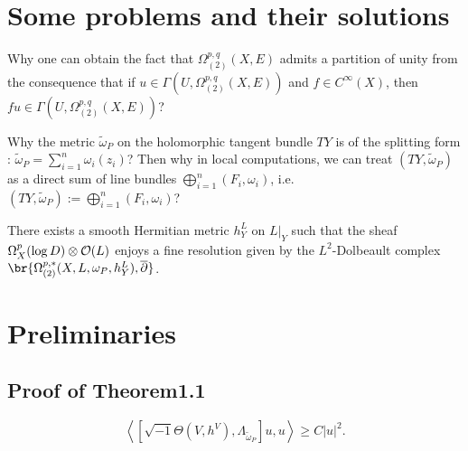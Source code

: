 \documentclass[lang=en,12pt]{beautybook}
\begin{document}
\section{Some problems and their solutions}
\begin{problem}
  Why one can obtain the fact that $\Omega_{(2)}^{p,q}(X,E)$ admits a partition of unity from the consequence that if $u\in \Gamma(U,\Omega_{(2)}^{p,q}(X,E))$ and $f\in C^\infty (X)$, then $fu\in \Gamma(U,\Omega_{(2)}^{p,q}(X,E))$?
\end{problem}
\begin{problem}
  Why the metric $\widetilde{\omega}_P$ on the holomorphic tangent bundle $TY$ is of the splitting form : $\widetilde{\omega}_P=\sum_{i=1}^{n}\omega_i (z_i)$? Then why in local computations, we can treat $(TY,\widetilde{\omega}_P)$ as a direct sum of line bundles $\bigoplus_{i=1}^n (F_i,\omega_i)$, i.e. $(TY,\widetilde{\omega}_P):=\bigoplus_{i=1}^n (F_i,\omega_i)$?
\end{problem}
  
  \begin{theorem}
    There exists a smooth Hermitian metric $h^L_Y$ on $L|_Y$ such that the sheaf $\Omega_X^p(\log D)\otimes{\mathcal O} (L)$ enjoys a fine resolution given by the $L^2$-Dolbeault complex $\br{\Omega^{p,*}_{(2)}(X,L,\omega_P,h^L_Y),\bdd}$.
  \end{theorem}

\section{Preliminaries}
\subsection{Proof of Theorem1.1}

\begin{lemma}[][3.3]
    \[ \left\langle \left[ \sqrt{- 1} \Theta (V, h^V), \Lambda_{\tilde{\omega}_P}
    \right] u, u \right\rangle \geqslant C | u |^2 . \]
\end{lemma}
\end{document}
